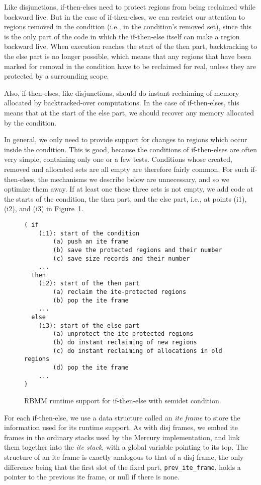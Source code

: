 \documentclass{tlp}
\newcommand{\code}[1]{{\tt#1}}
\begin{document}
Like disjunctions, if-then-elses
need to protect regions from being reclaimed while backward live.
But in the case of if-then-elses,
we can restrict our attention to regions removed in the condition
(i.e., in the condition's removed set),
since this is the only part of the code in which
the if-then-else itself can make a region backward live.
When execution reaches the start of the then part,
backtracking to the else part is no longer possible, which means that
any regions that have been marked for removal in the condition
have to be reclaimed for real, unless they are protected by a surrounding scope.

Also, if-then-elses, like disjunctions, should do instant reclaiming
of memory allocated by backtracked-over computations.
In the case of if-then-elses,
this means that at the start of the else part,
we should recover any memory allocated by the condition.

In general, we only need to provide support
for changes to regions which occur inside the condition.
This is good, because the conditions of if-then-elses are often very simple,
containing only one or a few tests.
Conditions whose created, removed and allocated sets are all empty
are therefore fairly common.
For such if-then-elses, the mechanisms we describe below are unnecessary,
and so we optimize them away.
If at least one these three sets is not empty,
we add code at the starts of the condition, the then part, and the else part,
i.e., at points (i1), (i2), and (i3) in Figure~\ref{fig:supportite}.
\begin{figure}[htb]
\scriptsize
\begin{Verbatim}[frame=single,framerule=0.2pt,framesep=3pt]
( if
    (i1): start of the condition
        (a) push an ite frame
        (b) save the protected regions and their number
        (c) save size records and their number
    ...
  then
    (i2): start of the then part
        (a) reclaim the ite-protected regions
        (b) pop the ite frame
    ...
  else
    (i3): start of the else part
        (a) unprotect the ite-protected regions
        (b) do instant reclaiming of new regions
        (c) do instant reclaiming of allocations in old regions
        (d) pop the ite frame
    ...
)
\end{Verbatim}
\small
\caption{RBMM runtime support for if-then-else with semidet condition.}
\label{fig:supportite}
\normalsize
\end{figure}

For each if-then-else, we use a data structure called an \emph{ite frame}
to store the information used for its runtime support.
As with disj frames,
we embed ite frames in the ordinary stacks used by the Mercury implementation,
and link them together into the \emph{ite stack},
with a global variable pointing to its top.
The structure of an ite frame is exactly analogous to that of a disj frame,
the only difference being that
the first slot of the fixed part, \code{prev\_ite\_frame},
holds a pointer to the previous ite frame, or null if there is none.
\end{document}
